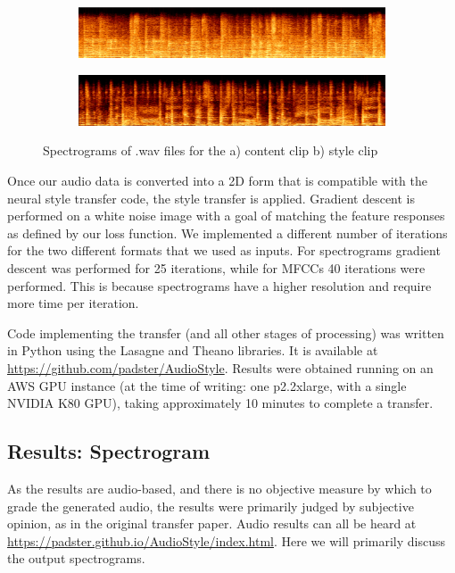 \documentclass{article}
\begin{document}
\begin{figure}[!ht]
\begin{subfigure}{\textwidth}
  \centering
  \includegraphics[width = \textwidth]{content_spec}
  \caption{}
\end{subfigure}
\begin{subfigure}{\textwidth}
  \centering
  \includegraphics[width = \textwidth]{style_spec}
  \caption{}
\end{subfigure}
\caption{Spectrograms of .wav files for the a) content clip b) style clip}
\end{figure}

Once our audio data is converted into a 2D form that is compatible with the neural style transfer code, the style transfer is applied. Gradient descent is performed on a white noise image with a goal of matching the feature responses as defined by our loss function. We implemented a different number of iterations for the two different formats that we used as inputs. For spectrograms gradient descent was performed for 25 iterations, while for MFCCs 40 iterations were performed. This is because spectrograms have a higher resolution and require more time per iteration.

Code implementing the transfer (and all other stages of processing) was written in Python using the Lasagne and Theano libraries. It is available at \url{https://github.com/padster/AudioStyle}. Results were obtained running on an AWS GPU instance (at the time of writing: one p2.2xlarge, with a single NVIDIA K80 GPU), taking approximately 10 minutes to complete a transfer. 

\subsection{Results: Spectrogram}

As the results are audio-based, and there is no objective measure by which to grade the generated audio, the results were primarily judged by subjective opinion, as in the original transfer paper. Audio results can all be heard at \url{https://padster.github.io/AudioStyle/index.html}. Here we will primarily discuss the output spectrograms.
\end{document}
